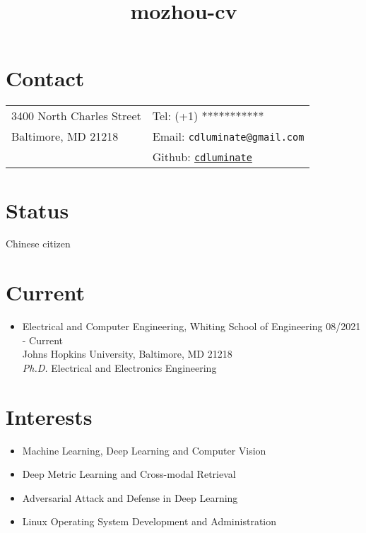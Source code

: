 \documentclass[10pt,margin,line,pifont,palatino,courier]{res}
\begin{document}
\title{mozhou-cv}
\begin{resume}

\section{\sc Contact}

\vspace{.05in}
\begin{tabular}{@{}p{2.2in}p{2.2in}}
3400 North Charles Street & Tel: (+1) *********** \\
Baltimore, MD 21218       & Email: \verb+cdluminate@gmail.com+\\
			              & Github: \href{https://github.com/cdluminate}{\tt cdluminate}
\end{tabular}

\section{\sc Status}
Chinese citizen

\section{\sc Current}

\begin{itemize}[leftmargin=*]
\item Electrical and Computer Engineering, Whiting School of Engineering
	\hfill 08/2021 - Current\\
	Johns Hopkins University, Baltimore, MD 21218\\
	\textit{Ph.D.} Electrical and Electronics Engineering
\end{itemize}

\section{\sc Interests}
\begin{itemize}[noitemsep, leftmargin=*]
	\item Machine Learning, Deep Learning and Computer Vision
	\item Deep Metric Learning and Cross-modal Retrieval
	\item Adversarial Attack and Defense in Deep Learning
	\item Linux Operating System Development and Administration
\end{itemize}
 

\end{resume}
\end{document}
